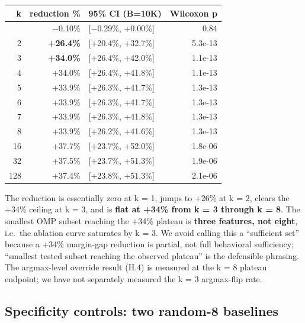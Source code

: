 \documentclass[
  11pt,
  a4paper]{article}
\newcounter{none} %
\begin{document}
{\def\LTcaptype{none} %
\begin{longtable}[]{@{}rrlr@{}}
\toprule\noalign{}
k & reduction \% & 95\% CI (B=10K) & Wilcoxon p \\
\midrule\noalign{}
\endhead
\bottomrule\noalign{}
\endlastfoot
1 & \ensuremath{-}0.10\% & {[}\ensuremath{-}0.29\%, +0.00\%{]} & 0.84 \\
2 & \textbf{+26.4\%} & {[}+20.4\%, +32.7\%{]} & 5.3e-13 \\
3 & \textbf{+34.0\%} & {[}+26.4\%, +42.0\%{]} & 1.1e-13 \\
4 & +34.0\% & {[}+26.4\%, +41.8\%{]} & 1.1e-13 \\
5 & +33.9\% & {[}+26.3\%, +41.7\%{]} & 1.3e-13 \\
6 & +33.9\% & {[}+26.3\%, +41.7\%{]} & 1.3e-13 \\
7 & +33.9\% & {[}+26.3\%, +41.8\%{]} & 1.3e-13 \\
8 & +33.9\% & {[}+26.2\%, +41.6\%{]} & 1.3e-13 \\
16 & +37.7\% & {[}+23.7\%, +52.0\%{]} & 1.8e-06 \\
32 & +37.5\% & {[}+23.7\%, +51.3\%{]} & 1.9e-06 \\
128 & +37.4\% & {[}+23.8\%, +51.3\%{]} & 2.1e-06 \\
\end{longtable}
}

The reduction is essentially zero at k = 1, jumps to +26\% at k = 2,
clears the +34\% ceiling at k = 3, and is \textbf{flat at +34\% from k =
3 through k = 8}. The smallest OMP subset reaching the +34\% plateau is
\textbf{three features, not eight}, i.e.~the ablation curve saturates by
k = 3. We avoid calling this a ``sufficient set'' because a +34\%
margin-gap reduction is partial, not full behavioral sufficiency;
``smallest tested subset reaching the observed plateau'' is the
defensible phrasing. The argmax-level override result (H.4) is measured
at the k = 8 plateau endpoint; we have not separately measured the k = 3
argmax-flip rate.

\subsection{Specificity controls: two random-8
baselines}\label{specificity-controls-two-random-8-baselines}
\end{document}
